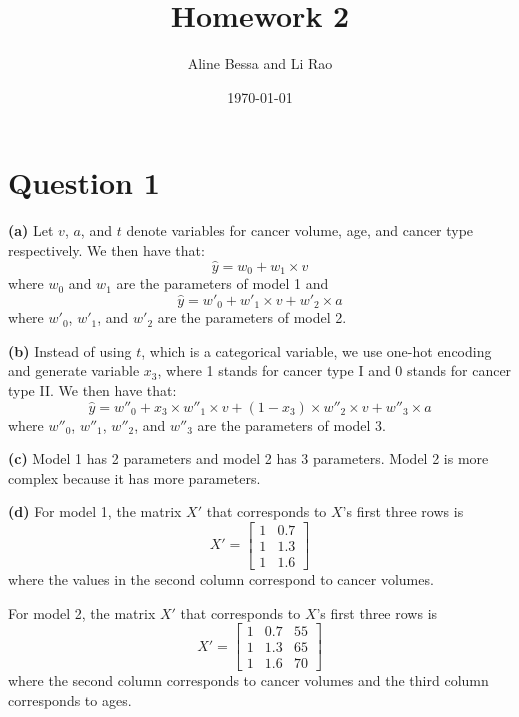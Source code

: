 \documentclass[leqno]{article}
\title{Homework 2}
\author{Aline Bessa and Li Rao}
\date\today
\begin{document}
\maketitle %

\section*{Question 1}

\textbf{(a)} Let $v$, $a$, and $t$ denote variables for cancer volume, age, and cancer type respectively. We then have that:
\begin{equation*}
\hat{y} = w_0 + w_1 \times v
\end{equation*}
where $w_0$ and $w_1$ are the parameters of model 1 and
\begin{equation*}
\hat{y} = w'_0 + w'_1 \times v + w'_2 \times a
\end{equation*}
where $w'_0$, $w'_1$, and $w'_2$ are the parameters of model 2.

\hfill

\noindent \textbf{(b)} Instead of using $t$, which is a categorical variable, we use one-hot encoding and generate variable $x_3$, where 1 stands for cancer type I and 
0 stands for cancer type II. We then have that:
\begin{equation*}
\hat{y} = w''_0 + x_3 \times w''_1 \times v + (1 - x_3) \times w''_2 \times v  + w''_3 \times a 
\end{equation*}
where $w''_0$, $w''_1$, $w''_2$, and $w''_3$ are the parameters of model 3.

\hfill

\noindent \textbf{(c)} Model 1 has 2 parameters and model 2 has 3 parameters. Model 2 is more complex because it has more parameters.

\hfill

\noindent \textbf{(d)} For model 1, the matrix $X'$ that corresponds to $X$'s first three rows is
\[
X'=
  \begin{bmatrix}
    1 & 0.7 \\
    1 & 1.3 \\
    1 & 1.6
  \end{bmatrix}
\]
where the values in the second column correspond to cancer volumes.

\noindent For model 2, the matrix $X'$ that corresponds to $X$'s first three rows is
\[
X'=
  \begin{bmatrix}
    1 & 0.7 & 55 \\
    1 & 1.3 & 65 \\
    1 & 1.6 & 70
  \end{bmatrix}
\]
where the second column corresponds to cancer volumes and the third column corresponds to ages.
\end{document}
